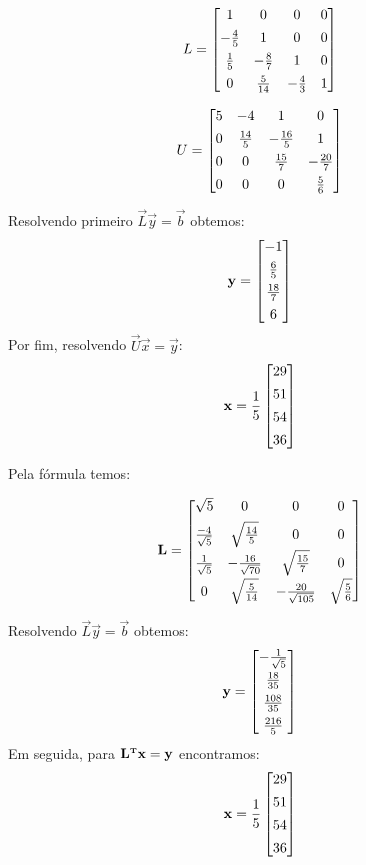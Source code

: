 \documentclass{homework}
\begin{document}
		$$ L = \left[\begin{array}{@{}cccc@{}}
		1 &  0 & 0 & 0\\[1ex]
		-\frac{4}{5} &  1 & 0 & 0\\[1ex]
		\frac{1}{5} &  -\frac{8}{7} & 1 & 0\\[1ex]
		0 & \frac{5}{14} & -\frac{4}{3} & 1
		\end{array}\right]$$
		
		$$ U = \left[\begin{array}{@{}cccc@{}}
		5 &  -4 & 1 & 0\\[1ex]
		0 &  \frac{14}{5} & -\frac{16}{5} & 1\\[1ex]
		0 &  0 & \frac{15}{7} & -\frac{20}{7}\\[1ex]
		0 &  0 & 0 & \frac{5}{6}
		\end{array}\right]$$
		
		Resolvendo primeiro $\vec{L}\vec{y} = \vec{b}$ obtemos:
			$$\vec{y} = \left[\begin{array}{@{}c@{}}
			-1\\[1ex]
			\frac{6}{5}\\[1ex]
			\frac{18}{7}\\[1ex]
			6
			\end{array}\right]$$
		Por fim, resolvendo $\vec{U}\vec{x} = \vec{y}$:
			$$\vec{x} = \frac{1}{5}\left[\begin{array}{@{}c@{}}
			29\\[1ex]
			51\\[1ex]
			54\\[1ex]
			36
			\end{array}\right]
			$$
			
		\subsubsubquest[Decomposição de \textit{Cholesky} $\vec{A} = \vec{L}\vec{L}^\T$]%
		
		Pela fórmula temos:
		
		$$\vec{L} = \left[\begin{array}{@{}cccc@{}}
		\sqrt{5} &  0 & 0 & 0\\[1ex]
		\frac{-4}{\sqrt{5}} & \sqrt{\frac{14}{5}} & 0 & 0\\[1ex]
		\frac{1}{\sqrt{5}} & -\frac{16}{\sqrt{70}} & \sqrt{\frac{15}{7}} & 0\\[1ex]
		0 & \sqrt{\frac{5}{14}} & -\frac{20}{\sqrt{105}} & \sqrt{\frac{5}{6}}
		\end{array}\right]$$
		
		Resolvendo $\vec{L} \vec{y} = \vec{b}$ obtemos:
		$$\vec{y} = \left[\begin{array}{@{}c@{}}
		-\frac{1}{\sqrt{5}}\\[1ex]
		\frac{18}{35}\\[1ex]
		\frac{108}{35}\\[1ex]
		\frac{216}{5}
		\end{array}\right]$$
		Em seguida, para $\mathbf{L}^{\text{\bfseries\tiny T}} \mathbf{x} = \mathbf{y}$ encontramos:
		$$\vec{x} = \frac{1}{5}\left[\begin{array}{@{}c@{}}
		29\\[1ex]
		51\\[1ex]
		54\\[1ex]
		36
		\end{array}\right]
		$$
		
\end{document}

